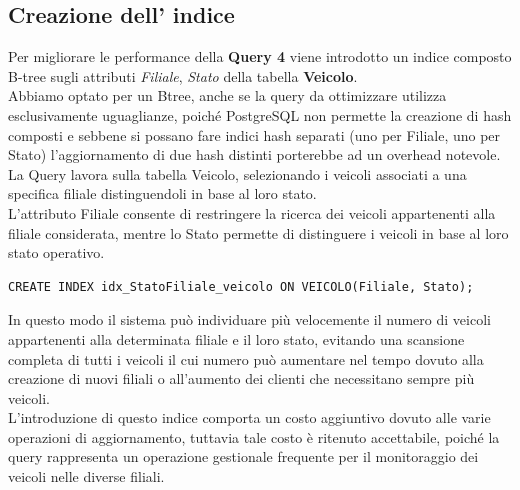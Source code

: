 \documentclass[10pt,a4paper]{article}
\begin{document}
\subsection{Creazione dell' indice}
Per migliorare le performance della \textbf{Query 4} viene introdotto un indice composto B-tree sugli attributi \textit{Filiale}, \textit{Stato} della tabella \textbf{Veicolo}.\\
Abbiamo optato per un Btree, anche se la query da ottimizzare utilizza esclusivamente uguaglianze, poiché PostgreSQL non permette la creazione di hash composti e sebbene si possano fare indici hash separati (uno per Filiale, uno per Stato) l'aggiornamento di due hash distinti porterebbe ad un overhead notevole.
La Query lavora sulla tabella Veicolo, selezionando i veicoli associati a una specifica filiale distinguendoli in base al loro stato.\\
L’attributo Filiale consente di restringere la ricerca dei veicoli appartenenti alla filiale considerata, mentre lo Stato permette di distinguere i veicoli in base al loro stato operativo.
\begin{lstlisting}
CREATE INDEX idx_StatoFiliale_veicolo ON VEICOLO(Filiale, Stato);
\end{lstlisting}
In questo modo il sistema può individuare più velocemente il numero di veicoli appartenenti alla determinata filiale e il loro stato, evitando una scansione completa di tutti i veicoli il cui numero può aumentare nel tempo dovuto alla creazione di nuovi filiali o all'aumento dei clienti che necessitano sempre più veicoli.\\
L’introduzione di questo indice comporta un costo aggiuntivo dovuto alle varie operazioni di aggiornamento, tuttavia tale costo è ritenuto accettabile, poiché la query rappresenta un operazione gestionale frequente per il monitoraggio dei veicoli nelle diverse filiali.
\end{document}
